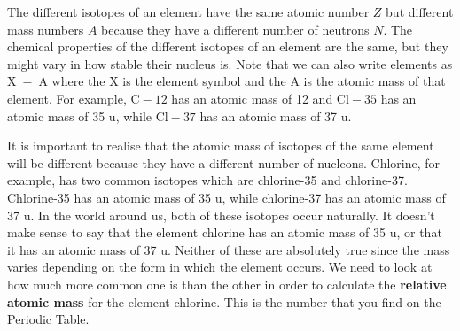 \label{m38753*id257405}The different isotopes of an element have the same atomic
number $Z$ but different mass numbers $A$ because they have a different
number of neutrons $N$. The chemical properties of the different
isotopes of an element are the same, but they might vary in how stable their nucleus is. Note that we can also write elements as $\mathrm{X\; -\; A}$ where the X is the element symbol and the A is the atomic mass of that element. For example, $\mathrm{C-}12$ has an atomic mass of 12 and $\mathrm{Cl-}35$ has an atomic mass of 35 u, while $\mathrm{Cl-}37$ has an atomic mass of 37 u.\par 
\label{m38753*notfhsst!!!underscore!!!id393}



\label{m38753*id248557}It is important to realise that the atomic mass of isotopes of the same element will be different because they have a different number of nucleons. Chlorine, for example, has two common isotopes which are chlorine-35 and chlorine-37. Chlorine-35 has an atomic mass of 35 u, while chlorine-37 has an atomic mass of 37 u. In the world around us, both of these isotopes occur naturally. It doesn't make sense to say that the element chlorine has an atomic mass of 35 u, or that it has an atomic mass of 37 u. Neither of these are absolutely true since the mass varies depending on the form in which the element occurs. We need to look at how much more common one is than the other in order to calculate the \textbf{relative atomic mass} for the element chlorine. This is the number that you find on the Periodic Table.\par 



